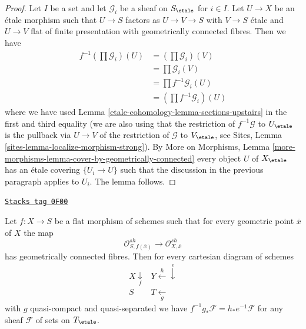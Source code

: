 \begin{proof}
Let $I$ be a set and let $\mathcal{G}_i$ be a sheaf on $S_\etale$
for $i \in I$.
Let $U \to X$ be an \'etale morphism such that $U \to S$ factors as
$U \to V \to S$ with $V \to S$ \'etale and $U \to V$ flat of finite
presentation with geometrically connected fibres. Then we have
\begin{align*}
f^{-1}(\prod \mathcal{G}_i)(U)
& =
(\prod \mathcal{G}_i)(V) \\
& =
\prod \mathcal{G}_i(V) \\
& =
\prod f^{-1}\mathcal{G}_i(U) \\
& =
(\prod f^{-1}\mathcal{G}_i)(U)
\end{align*}
where we have used Lemma \ref{etale-cohomology-lemma-sections-upstairs}
in the first and third equality
(we are also using that the restriction of $f^{-1}\mathcal{G}$
to $U_\etale$ is the pullback via $U \to V$ of the restriction of
$\mathcal{G}$ to $V_\etale$, see
Sites, Lemma \ref{sites-lemma-localize-morphism-strong}).
By More on Morphisms, Lemma
\ref{more-morphisms-lemma-cover-by-geometrically-connected}
every object $U$ of $X_\etale$ has an \'etale covering
$\{U_i \to U\}$ such that the discussion in the previous
paragraph applies to $U_i$. The lemma follows.
\end{proof}

\begin{lemma}
\label{etale-cohomology-lemma-base-change-f-star}
\href{https://stacks.math.columbia.edu/tag/0F00}{\texttt{Stacks tag 0F00}}

Let $f : X \to S$ be a flat morphism of schemes such
that for every geometric point $\overline{x}$ of $X$ the map
$$
\mathcal{O}_{S, f(\overline{x})}^{sh}
\longrightarrow
\mathcal{O}_{X, \overline{x}}^{sh}
$$
has geometrically connected fibres. Then for every
cartesian diagram of schemes
$$
\begin{array}{cc}X \underset{f}{\downarrow} & Y \overset{h}{\longleftarrow}\overset{e}{\downarrow} \\ S & T \underset{g}{\longleftarrow}\end{array}
$$
with $g$ quasi-compact and quasi-separated we have
$f^{-1}g_*\mathcal{F} = h_*e^{-1}\mathcal{F}$
for any sheaf $\mathcal{F}$ of sets on $T_\etale$.
\end{lemma}

